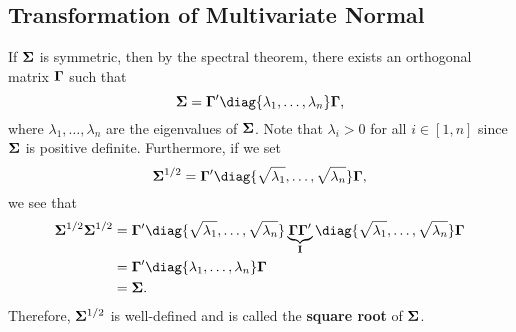 \subsection*{Transformation of Multivariate Normal}
If $ \mathbf{\Sigma} $ is symmetric, then by the spectral theorem, there exists an orthogonal matrix
$ \mathbf{\Gamma} $ such that
\[ \Matrix{\Sigma}=\Matrix{\Gamma}'\diag{\lambda_1,\ldots,\lambda_n}\Matrix{\Gamma}, \]
where $ \lambda_1,\ldots,\lambda_n $ are the eigenvalues of $ \mathbf{\Sigma} $.
Note that $ \lambda_i>0 $ for all $ i\in[1,n] $ since $ \mathbf{\Sigma} $ is
positive definite. Furthermore, if we set
\[ \Matrix{\Sigma}^{1/2}=\Matrix{\Gamma}'\diag{\sqrt{\lambda_1},\ldots,\sqrt{\lambda_n}}\Matrix{\Gamma}, \]
we see that
\begin{align*}
    \Matrix{\Sigma}^{1/2}\Matrix{\Sigma}^{1/2}
     & =\Matrix{\Gamma}'\diag{\sqrt{\lambda_1},\ldots,\sqrt{\lambda_n}}\underbrace{\Matrix{\Gamma}\Matrix{\Gamma}'}_{\Matrix{I}}\diag{\sqrt{\lambda_1},\ldots,\sqrt{\lambda_n}}\Matrix{\Gamma} \\
     & =\Matrix{\Gamma}'\diag{\lambda_1,\ldots,\lambda_n}\Matrix{\Gamma}                                                                                                                       \\
     & =\Matrix{\Sigma}.
\end{align*}
Therefore, $ \mathbf{\Sigma}^{1/2} $ is well-defined and is called the \textbf{square root} of
$ \mathbf{\Sigma} $.

